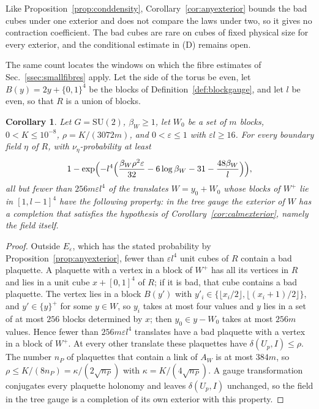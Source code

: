 \documentclass[11pt]{amsart}
\newtheorem{corollary}[theorem]{Corollary}
\theoremstyle{definition}
\theoremstyle{remark}
\numberwithin{equation}{section}
\newcommand{\SU}{\mathrm{SU}}
\begin{document}
Like Proposition~\ref{prop:conddensity}, Corollary~\ref{cor:anyexterior}
bounds the bad cubes under one exterior and does not compare the laws under
two, so it gives no contraction coefficient. The bad cubes are rare on cubes
of fixed physical size for every exterior, and the conditional estimate in
(D) remains open.

The same count locates the windows on which the fibre estimates of
Sec.~\ref{ssec:smallfibres} apply. Let the side of the torus be even, let
$B(y)=2y+\{0,1\}^4$ be the blocks of Definition~\ref{def:blockgauge}, and let
$l$ be even, so that $R$ is a union of blocks.

\begin{corollary}\label{cor:localcalm}
Let $G=\SU(2)$, $\beta_W\ge1$, let $W_0$ be a set of $m$ blocks, $0<K\le
10^{-8}$, $\rho=K/(3072m)$, and $0<\varepsilon\le1$ with $\varepsilon l\ge16$.
For every boundary field $\eta$ of $R$, with $\nu_\eta$-probability at least
\[
1-\exp\Bigl(-l^4\Bigl(\frac{\beta_W\rho^2\varepsilon}{32}-6\log\beta_W
-31-\frac{48\beta_W}l\Bigr)\Bigr),
\]
all but fewer than $256m\varepsilon l^4$ of the translates $W=y_0+W_0$ whose
blocks of $W^+$ lie in $[1,l-1]^4$ have the following property: in the tree
gauge the exterior of $W$ has a completion that satisfies the hypothesis of
Corollary~\ref{cor:calmexterior}, namely the field itself.
\end{corollary}

\begin{proof}
Outside $E_\varepsilon$, which has the stated probability by
Proposition~\ref{prop:anyexterior}, fewer than $\varepsilon l^4$ unit cubes of
$R$ contain a bad plaquette. A plaquette with a vertex in a block of $W^+$
has all its vertices in $R$ and lies in a unit cube $x+[0,1]^4$ of $R$; if it
is bad, that cube contains a bad plaquette. The vertex lies in a block
$B(y')$ with $y'_i\in\{\lfloor x_i/2\rfloor,\lfloor(x_i+1)/2\rfloor\}$, and
$y'\in\{y\}^+$ for some $y\in W$, so $y_i$ takes at most four values and $y$
lies in a set of at most $256$ blocks determined by $x$; then $y_0\in y-W_0$
takes at most $256m$ values. Hence fewer than $256m\varepsilon l^4$
translates have a bad plaquette with a vertex in a block of $W^+$. At every
other translate these plaquettes have $\delta(U_p,I)\le\rho$. The number
$n_P$ of plaquettes that contain a link of $A_W$ is at most $384m$, so $\rho
\le K/(8n_P)=\kappa/(2\sqrt{n_P})$ with $\kappa=K/(4\sqrt{n_P})$. A gauge
transformation conjugates every plaquette holonomy and leaves $\delta(U_p,
I)$ unchanged, so the field in the tree gauge is a completion of its own
exterior with this property.
\end{proof}
\end{document}
